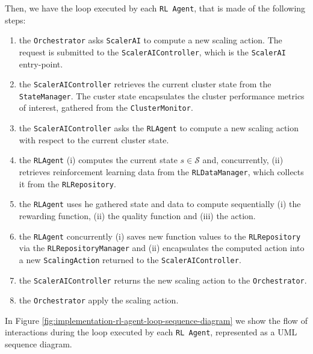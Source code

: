 Then, we have the loop executed by each \texttt{RL Agent}, that is made of the following steps:
%
\begin{enumerate}
	
	\item the \texttt{Orchestrator} asks \texttt{ScalerAI} to compute a new scaling action. The request is submitted to the \texttt{ScalerAIController}, which is the \texttt{ScalerAI} entry-point.
	
	\item the \texttt{ScalerAIController} retrieves the current cluster state from the \texttt{StateManager}. The custer state encapsulates the cluster performance metrics of interest, gathered from the \texttt{ClusterMonitor}.
	
	\item the \texttt{ScalerAIController} asks the \texttt{RLAgent} to compute a new scaling action with respect to the current cluster state.
	
	\item the \texttt{RLAgent} (i) computes the current state $s\in\mathcal{S}$ and, concurrently, (ii) retrieves reinforcement learning data from the \texttt{RLDataManager}, which collects it from the \texttt{RLRepository}.
	
	\item the \texttt{RLAgent} uses he gathered state and data to compute sequentially (i) the rewarding function, (ii) the quality function and (iii) the action.
	
	\item the \texttt{RLAgent} concurrently (i) saves new function values to the \texttt{RLRepository} via the \texttt{RLRepositoryManager} and (ii) encapsulates the computed action into a new \texttt{ScalingAction} returned to the \texttt{ScalerAIController}.
	
	\item the \texttt{ScalerAIController} returns the new scaling action to the \texttt{Orchestrator}.
	
	\item the \texttt{Orchestrator} apply the scaling action.
	
\end{enumerate}
%
In Figure \ref{fig:implementation-rl-agent-loop-sequence-diagram} we show the flow of interactions during the loop executed by each \texttt{RL Agent}, represented as a UML sequence diagram.

